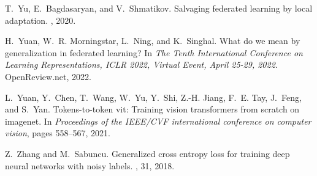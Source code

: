 \documentclass[11pt]{article}
\begin{document}
\begin{thebibliography}{10}
T.~Yu, E.~Bagdasaryan, and V.~Shmatikov.
\newblock Salvaging federated learning by local adaptation.
, 2020.

H.~Yuan, W.~R. Morningstar, L.~Ning, and K.~Singhal.
\newblock What do we mean by generalization in federated learning?
\newblock In {\em The Tenth International Conference on Learning
  Representations, {ICLR} 2022, Virtual Event, April 25-29, 2022}.
  OpenReview.net, 2022.

L.~Yuan, Y.~Chen, T.~Wang, W.~Yu, Y.~Shi, Z.-H. Jiang, F.~E. Tay, J.~Feng, and
  S.~Yan.
\newblock Tokens-to-token vit: Training vision transformers from scratch on
  imagenet.
\newblock In {\em Proceedings of the IEEE/CVF international conference on
  computer vision}, pages 558--567, 2021.

Z.~Zhang and M.~Sabuncu.
\newblock Generalized cross entropy loss for training deep neural networks with
  noisy labels.
, 31, 2018.

\end{thebibliography}
\end{document}
